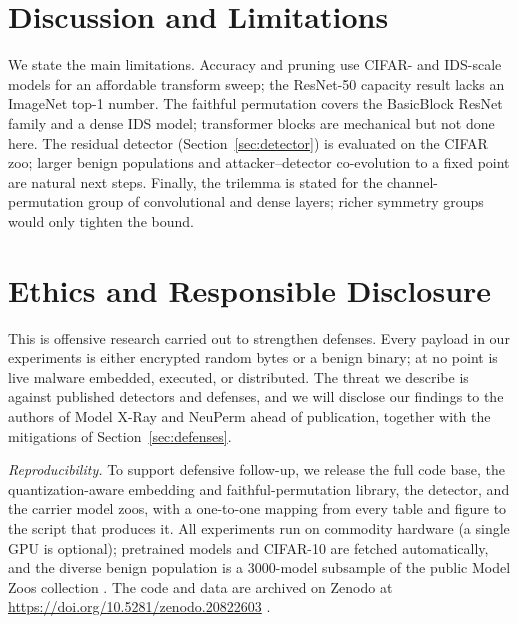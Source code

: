 \documentclass[10pt,journal]{IEEEtran}
\theoremstyle{remark}
\begin{document}
\section{Discussion and Limitations}\label{sec:disc}
We state the main limitations. Accuracy and pruning use CIFAR- and IDS-scale models for
an affordable transform sweep; the ResNet-50 capacity result lacks an ImageNet top-1
number. The faithful permutation covers the BasicBlock ResNet family and a dense IDS
model; transformer blocks are mechanical but not done here. The residual detector
(Section~\ref{sec:detector}) is evaluated on the CIFAR zoo; larger benign populations and
attacker--detector co-evolution to a fixed point are natural next steps. Finally, the
trilemma is stated for the channel-permutation group of convolutional and dense layers;
richer symmetry groups would only tighten the bound.

\section{Ethics and Responsible Disclosure}\label{sec:ethics}
This is offensive research carried out to strengthen defenses. Every payload in our
experiments is either encrypted random bytes or a benign binary; at no point is live
malware embedded, executed, or distributed. The threat we describe is against published
detectors and defenses, and we will disclose our findings to the authors of Model X-Ray
and NeuPerm ahead of publication, together with the mitigations of
Section~\ref{sec:defenses}.

\emph{Reproducibility.} To support defensive follow-up, we release the full code base, the
quantization-aware embedding and faithful-permutation library, the detector, and the
carrier model zoos, with a one-to-one mapping from every table and figure to the script
that produces it. All experiments run on commodity hardware (a single GPU is optional);
pretrained models and CIFAR-10 are fetched automatically, and the diverse benign population
is a $3000$-model subsample of the public Model Zoos collection \cite{schurholt2022modelzoos}.
The code and data are archived on Zenodo at
\url{https://doi.org/10.5281/zenodo.20822603} \cite{quantghost_code}.

\end{document}
